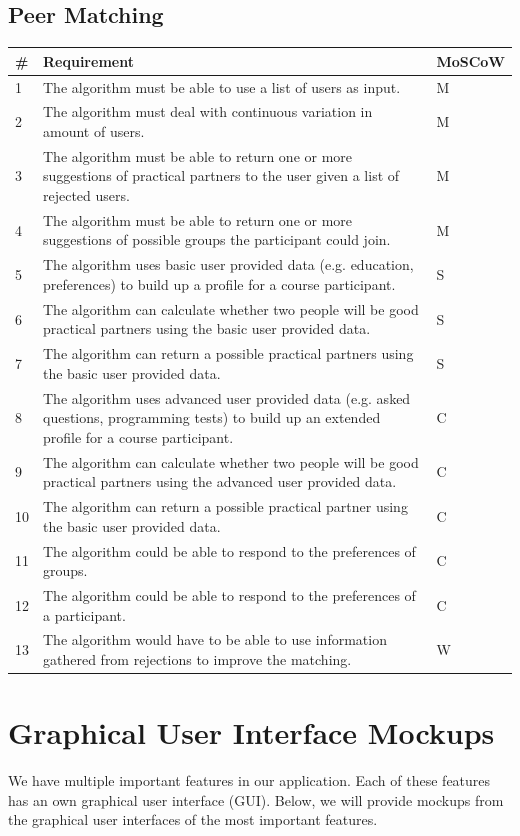 \subsection{Peer Matching}
\begin{tabular}{ | p{0.5cm} | p{12cm} | p{2cm} | }
\hline
\textbf{\#} & \textbf{Requirement} & \textbf{MoSCoW} \\ \hline
1 & The algorithm must be able to use a list of users as input. & M \\ \hline
2 & The algorithm must deal with continuous variation in amount of users. & M \\ \hline
3 & The algorithm must be able to return one or more suggestions of practical partners to the user given a list of rejected users. & M \\ \hline
4 & The algorithm must be able to return one or more suggestions of possible groups the participant could join. & M \\ \hline
5 & The algorithm uses basic user provided data (e.g. education, preferences) to build up a profile for a course participant. & S \\ \hline
6 & The algorithm can calculate whether two people will be good practical partners using the basic user provided data. & S \\ \hline
7 & The algorithm can return a possible practical partners using the basic user provided data. & S \\ \hline
8 & The algorithm uses advanced user provided data (e.g. asked questions, programming tests) to build up an extended profile for a course participant. & C \\ \hline
9 & The algorithm can calculate whether two people will be good practical partners using the advanced user provided data. & C \\ \hline
10 & The algorithm can return a possible practical partner using the basic user provided data. & C \\ \hline
11 & The algorithm could be able to respond to the preferences of groups. & C \\ \hline
12 & The algorithm could be able to respond to the preferences of a participant. & C \\ \hline
13 & The algorithm would have to be able to use information gathered from rejections to improve the matching. & W \\
\hline
\end{tabular}

\section{Graphical User Interface Mockups}
We have multiple important features in our application.
Each of these features has an own graphical user interface (GUI).
Below, we will provide mockups from the graphical user interfaces of the most important features.

